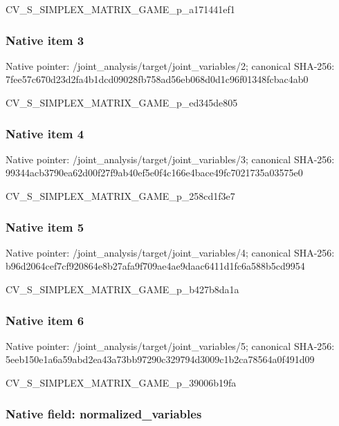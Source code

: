\documentclass[10pt,a4paper]{article}
\begin{document}
CV\_S\_SIMPLEX\_MATRIX\_GAME\_p\_a171441ef1


\subsubsection{Native item 3}


Native pointer: /joint\_analysis/target/j\allowbreak{}oint\_variables/2; canonical SHA-256: 7fee57c670d23d2fa4b1dcd0\allowbreak{}9028fb758ad56eb068d0d1c9\allowbreak{}6f01348fcbac4ab0


CV\_S\_SIMPLEX\_MATRIX\_GAME\_p\_ed345de805


\subsubsection{Native item 4}


Native pointer: /joint\_analysis/target/j\allowbreak{}oint\_variables/3; canonical SHA-256: 99344acb3790ea62d00f27f9\allowbreak{}ab40ef5e0f4c166e4bace49f\allowbreak{}c7021735a03575e0


CV\_S\_SIMPLEX\_MATRIX\_GAME\_p\_258cd1f3e7


\subsubsection{Native item 5}


Native pointer: /joint\_analysis/target/j\allowbreak{}oint\_variables/4; canonical SHA-256: b96d2064cef7cf920864e8b2\allowbreak{}7afa9f709ae4ae9daac6411d\allowbreak{}1fc6a588b5cd9954


CV\_S\_SIMPLEX\_MATRIX\_GAME\_p\_b427b8da1a


\subsubsection{Native item 6}


Native pointer: /joint\_analysis/target/j\allowbreak{}oint\_variables/5; canonical SHA-256: 5eeb150e1a6a59abd2ea43a7\allowbreak{}3bb97290c329794d3009c1b2\allowbreak{}ca78564a0f491d09


CV\_S\_SIMPLEX\_MATRIX\_GAME\_p\_39006b19fa


\subsubsection{Native field: normalized\_variables}
\end{document}

